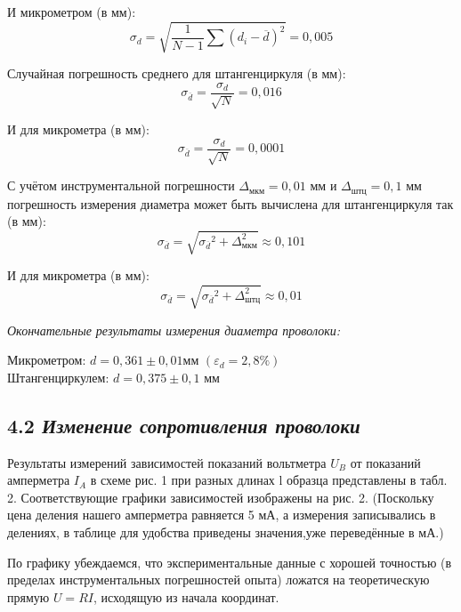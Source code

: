 И микрометром (в мм):
\begin{equation}
    \sigma_{d} = \sqrt{\frac{1}{N-1}\sum (d_{i}-\overline{d})^2} = 0,005
\end{equation}


Случайная погрешность среднего для штангенциркуля (в мм):
\begin{equation}
    \sigma_{\overline{d}} = \frac{\sigma_{d}}{\sqrt{N}} = 0,016
\end{equation}


И для микрометра (в мм):
\begin{equation}
    \sigma_{\overline{d}} = \frac{\sigma_{d}}{\sqrt{N}} = 0,0001
\end{equation}


С учётом инструментальной погрешности $\Delta _{мкм} = 0,01$ мм и $\Delta _{штц} = 0,1$ мм погрешность измерения диаметра
может быть вычислена для штангенциркуля так (в мм):
\begin{equation}
    \sigma{_{\overline{d}}} = \sqrt{\sigma{_{\overline{d}}}^2 + \Delta_{мкм}^2} \approx 0,101
\end{equation}


И для микрометра (в мм):
\begin{equation}
    \sigma {_{\overline{d}}} = \sqrt{\sigma{_{\overline{d}}}^2 + \Delta_{штц}^2} \approx 0,01
\end{equation}


\textit{Окончательные результаты измерения диаметра проволоки:}


Микрометром: $d = 0,361 \pm 0,01$мм $(\varepsilon_{d} = 2,8\%)$\\
Штангенциркулем: $d = 0,375 \pm 0,1$ мм

\subsection*{4.2 \textit{Изменение сопротивления проволоки }}

Результаты измерений зависимостей показаний вольтметра $U_{B}$ от показаний амперметра $I_{A}$ в схеме рис. 1 при разных длинах l образца представлены в табл. 2. Соответствующие графики зависимостей изображены на рис. 2. (Поскольку цена деления нашего амперметра равняется 5 мА, а измерения записывались в делениях, в таблице для удобства приведены значения,уже переведённые в мА.)

По графику убеждаемся, что экспериментальные данные с хорошей точностью (в пределах инструментальных погрешностей опыта) ложатся на теоретическую прямую $U = RI$, исходящую из начала координат.

